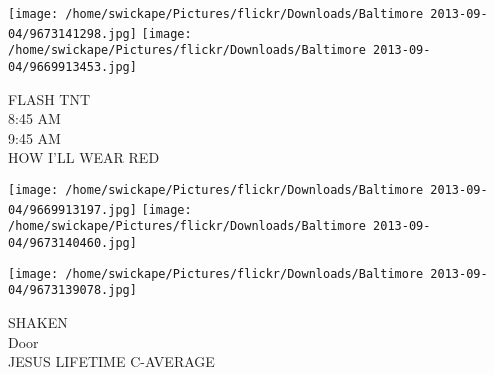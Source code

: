 \documentclass[10pt,letterpaper]{article}
\begin{document}
\texttt{[image: /home/swickape/Pictures/flickr/Downloads/Baltimore 2013-09-04/9673141298.jpg]}
\texttt{[image: /home/swickape/Pictures/flickr/Downloads/Baltimore 2013-09-04/9669913453.jpg]}

FLASH TNT\\
8:45 AM\\
9:45 AM\\
HOW I'LL WEAR RED
\pagebreak

\texttt{[image: /home/swickape/Pictures/flickr/Downloads/Baltimore 2013-09-04/9669913197.jpg]}
\texttt{[image: /home/swickape/Pictures/flickr/Downloads/Baltimore 2013-09-04/9673140460.jpg]}

\texttt{[image: /home/swickape/Pictures/flickr/Downloads/Baltimore 2013-09-04/9673139078.jpg]}

SHAKEN\\
Door\\
JESUS LIFETIME C{-}AVERAGE
\pagebreak
\end{document}
